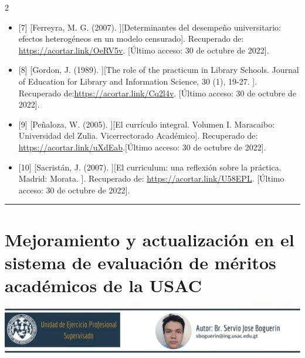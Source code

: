 \documentclass[12pt,spanish,Letterpaper,openany]{book}
\newcommand{\HRule}{\begin{center}\rule{0.5\linewidth}{0.2mm}\end{center}}
\begin{document}
\begin {multicols}{2}
\begin{itemize}
\item
  {[}7{]} {[}Ferreyra, M. G. (2007). {]}{[}Determinantes del desempeño universitario: efectos heterogéneos en un modelo censurado{]}. Recuperado de: \url{https://acortar.link/OeRV5v}. {[}Último acceso: 30 de octubre de 2022{]}.
\item
  {[}8{]} {[}Gordon, J. (1989). {]}{[}The role of the practicum in Library Schools. Journal of Education for Library and Information Science, 30 (1), 19-27. {]}. Recuperado de:\url{https://acortar.link/Cq2l4v}. {[}Último acceso: 30 de octubre de 2022{]}.
\item
  {[}9{]} {[}Peñaloza, W. (2005). {]}{[}El currículo integral. Volumen I. Maracaibo: Universidad del Zulia. Vicerrectorado Académico{]}. Recuperado de: \url{https://acortar.link/uXdEab}.{[}Último acceso: 30 de octubre de 2022{]}.
\item
  {[}10{]} {[}Sacristán, J. (2007). {]}{[}El curriculum: una reflexión sobre la práctica. Madrid: Morata. {]}. Recuperado de: \url{https://acortar.link/U58EPL}. {[}Último acceso: 30 de octubre de 2022{]}.
\end{itemize}

\end {multicols}
\medskip
\HRule
\medskip

\hypertarget{servio}{%
\chapter{Mejoramiento y actualización en el sistema de evaluación de méritos académicos de la USAC}\label{servio}}

\begin{center}\includegraphics[width=1\linewidth]{images/servio} \end{center}
\end{document}
